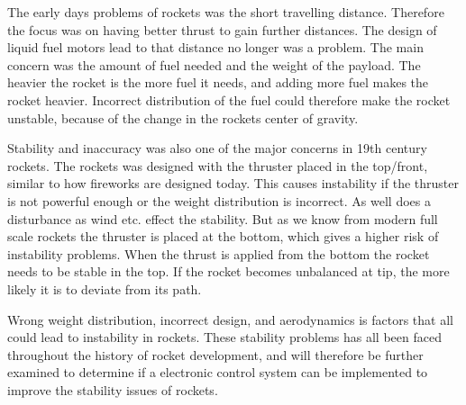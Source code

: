 The early days problems of rockets was the short travelling distance. Therefore the focus was on having better thrust to gain further distances. The design of liquid fuel motors lead to that distance no longer was a problem. The main concern was the amount of fuel needed and the weight of the payload. The heavier the rocket is the more fuel it needs, and adding more fuel makes the rocket heavier. Incorrect distribution of the fuel could therefore make the rocket unstable, because of the change in the rockets center of gravity.


Stability and inaccuracy was also one of the major concerns in 19th century rockets. The rockets was designed with the thruster placed in the top/front, similar to how fireworks are designed today. This causes instability if the thruster is not powerful enough or the weight distribution is incorrect. As well does a disturbance as wind etc. effect the stability. But as we know from modern full scale rockets the thruster is placed at the bottom, which gives a higher risk of instability problems. When the thrust is applied from the bottom the rocket needs to be stable in the top. If the rocket becomes unbalanced at tip, the more likely it is to deviate from its path. 


Wrong weight distribution, incorrect design, and aerodynamics is factors that all could lead to instability in rockets. These stability problems has all been faced throughout the history of rocket development, and will therefore be further examined to determine if a electronic control system can be implemented to improve the stability issues of rockets.



